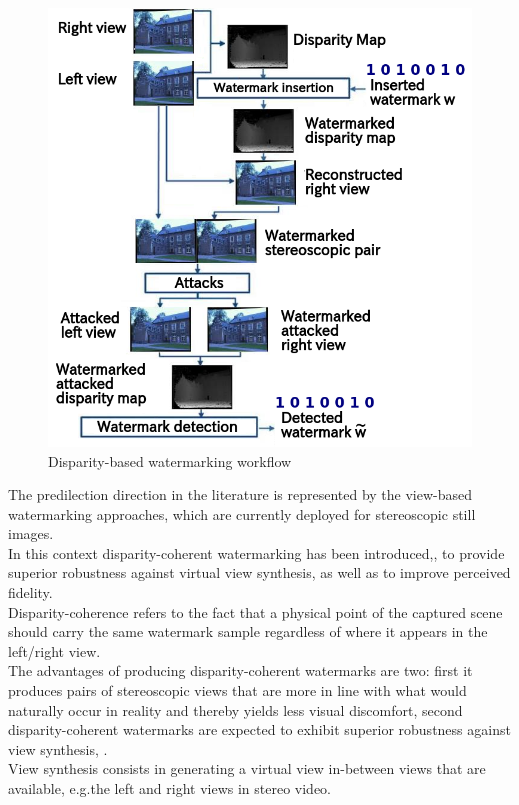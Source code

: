\begin{figure}[h!]
\centering
\includegraphics[width=1.05\textwidth]{./img/disparity_domain.png}
\caption{\small{Disparity-based watermarking workflow}}
\label{fig:disp}
\end{figure}


The predilection direction in the literature is represented by the view-based watermarking approaches, which are currently deployed for stereoscopic still images.\\ 
In this context disparity-coherent watermarking has been introduced,\cite{DOER}, to provide superior robustness against virtual view synthesis, as well as to improve perceived fidelity.\\
Disparity-coherence refers to the fact that a physical point of the captured scene should carry the
same watermark sample regardless of where it appears in the left/right view.\\
The advantages of producing disparity-coherent watermarks are two: first it produces pairs of stereoscopic views that are more in line with
what would naturally occur in reality and thereby yields less visual discomfort, second  disparity-coherent watermarks are expected to exhibit superior robustness against view synthesis, \cite{DOER}.\\
View synthesis consists in generating a virtual view in-between views that are available, e.g.the left and right views in stereo video. 

